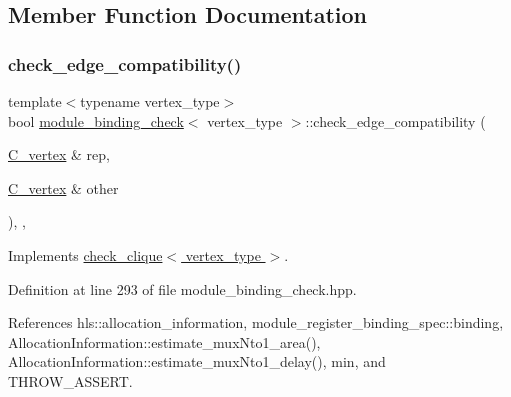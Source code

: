 \subsection{Member Function Documentation}
\mbox{\label{structmodule__binding__check_a36a3f9d2c01d19f8a3d4b0a2bbc0d021}} 
\subsubsection{\texorpdfstring{check\+\_\+edge\+\_\+compatibility()}{check\_edge\_compatibility()}}
{\footnotesize\ttfamily template$<$typename vertex\+\_\+type$>$ \\
bool \hyperlink{structmodule__binding__check}{module\+\_\+binding\+\_\+check}$<$ vertex\+\_\+type $>$\+::check\+\_\+edge\+\_\+compatibility (\begin{DoxyParamCaption}\item[{\hyperlink{clique__covering__graph_8hpp_a9cb45047ea8c5ed95a8cfa90494345aa}{C\+\_\+vertex} \&}]{rep,  }\item[{\hyperlink{clique__covering__graph_8hpp_a9cb45047ea8c5ed95a8cfa90494345aa}{C\+\_\+vertex} \&}]{other }\end{DoxyParamCaption})\hspace{0.3cm}{\ttfamily [inline]}, {\ttfamily [override]}, {\ttfamily [virtual]}}



Implements \hyperlink{structcheck__clique_a5d5ad28e723a12d105f578360959ec53}{check\+\_\+clique$<$ vertex\+\_\+type $>$}.



Definition at line 293 of file module\+\_\+binding\+\_\+check.\+hpp.



References hls\+::allocation\+\_\+information, module\+\_\+register\+\_\+binding\+\_\+spec\+::binding, Allocation\+Information\+::estimate\+\_\+mux\+Nto1\+\_\+area(), Allocation\+Information\+::estimate\+\_\+mux\+Nto1\+\_\+delay(), min, and T\+H\+R\+O\+W\+\_\+\+A\+S\+S\+E\+RT.

